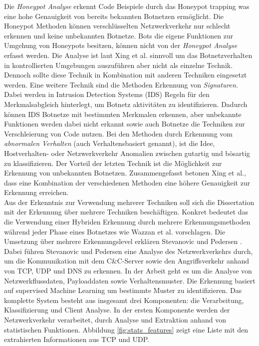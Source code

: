 Die \textit{Honeypot Analyse} erkennt Code Beispiele durch das Honeypot trapping was eine hohe Genauigkeit von bereits bekannten Botnetzen ermöglicht. Die Honeypot Methoden können
verschlüsselten Netzwerkverkehr nur schlecht erkennen und keine unbekannten Botnetze. Bots die eigene Funktionen zur Umgehung von Honeypots besitzen, können nicht von der \textit{Honeypot 
Analyse} erfasst werden. Die Analyse ist laut Xing et al. sinnvoll um das Botnetzverhalten in kontrollierten Umgebungen auszuführen aber nicht als einzelne Technik.
Dennoch sollte diese Technik in Kombination mit anderen Techniken eingesetzt werden. Eine weitere Technik sind die Methoden Erkennung von \textit{Signaturen}. Dabei 
werden in Intrusion Detection Systems (IDS) Regeln für den Merkmalsabgleich hinterlegt, um Botnetz aktivitäten zu identifizieren. Dadurch können IDS Botnetze mit bestimmten Merkmalen 
erkennen, aber unbekannte Funktionen werden dabei nicht erkannt sowie auch Botnetze die Techniken zur Verschleierung von Code nutzen. Bei den Methoden durch Erkennung vom
\textit{abnormalen Verhalten} (auch Verhaltensbasiert genannt), ist die Idee, Hostverhalten- oder Netzwerkverkehr Anomalien zwischen gutartig und bösartig zu klassifizieren. Der Vorteil der 
letzten Technik ist die Möglichkeit zur Erkennung von unbekannten Botnetzen.
Zusammengefasst betonen Xing et al., dass eine Kombination der verschiedenen Methoden eine höhere Genauigkeit zur Erkennung erreichen. \\ Aus der Erkenntnis zur Verwendung mehrerer Techniken 
soll sich die Dissertation mit der Erkennung über mehrere Techniken beschäftigen. Konkret bedeutet das die Verwendung einer Hybriden Erkennung durch mehrere Erkennungsmethoden während jeder Phase 
eines Botnetzes wie Wazzan et al. \cite{Wazzan2021InternetOT} vorschlagen. Die Umsetzung über mehrere Erkennungslevel erklären Stevanovic und Pedersen \cite{DBLP:journals/ijcysa/StevanovicP16}. 
Dabei führen Stevanovic und Pedersen eine Analyse des Netzwerkverkehrs durch, um die Kommunikation mit dem C\&C-Server sowie den Angriffsverkehr anhand von TCP, UDP und DNS zu erkennen. In der Arbeit 
geht es um die Analyse von Netzwerkflussdaten, Payloaddaten sowie Verhaltensmuster. Die Erkennung basiert auf supervised Machine Learning um bestimmte Muster zu identifizieren. Das komplette System 
besteht aus insgesamt drei Komponenten: die Verarbeitung, Klassifizierung und Client Analyse. In der ersten Komponente werden der Netzwerkverkehr verarbeitet, durch Analyse und Extraktion anhand von 
statistischen Funktionen. Abbildung \ref{fig:stats_features} zeigt eine Liste mit den extrahierten Informationen aus TCP und UDP. 

